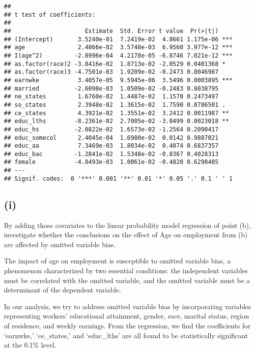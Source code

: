 \documentclass[
]{article}
\begin{document}
\begin{verbatim}
## 
## t test of coefficients:
## 
##                     Estimate  Std. Error t value  Pr(>|t|)    
## (Intercept)       3.5240e-01  7.2419e-02  4.8661 1.175e-06 ***
## age               2.4866e-02  3.5748e-03  6.9560 3.977e-12 ***
## I(age^2)         -2.8996e-04  4.2178e-05 -6.8746 7.021e-12 ***
## as.factor(race)2 -3.8416e-02  1.8713e-02 -2.0529 0.0401368 *  
## as.factor(race)3 -4.7501e-03  1.9209e-02 -0.2473 0.8046987    
## earnwke           3.4057e-05  9.5945e-06  3.5496 0.0003895 ***
## married          -2.6098e-03  1.0509e-02 -0.2483 0.8038795    
## ne_states         1.6760e-02  1.4487e-02  1.1570 0.2473497    
## so_states         2.3948e-02  1.3615e-02  1.7590 0.0786501 .  
## ce_states         4.3921e-02  1.3551e-02  3.2412 0.0011987 ** 
## educ_lths        -8.2361e-02  2.7005e-02 -3.0499 0.0023018 ** 
## educ_hs          -2.0822e-02  1.6573e-02 -1.2564 0.2090417    
## educ_somecol      2.4045e-04  1.6980e-02  0.0142 0.9887021    
## educ_aa           7.3469e-03  1.8034e-02  0.4074 0.6837357    
## educ_bac         -1.2841e-02  1.5348e-02 -0.8367 0.4028313    
## female           -4.8493e-03  1.0061e-02 -0.4820 0.6298405    
## ---
## Signif. codes:  0 '***' 0.001 '**' 0.01 '*' 0.05 '.' 0.1 ' ' 1
\end{verbatim}

\hypertarget{i-3}{%
\subsection{(i)}\label{i-3}}

By adding those covariates to the linear probability model regression of
point (b), investigate whether the conclusions on the effect of Age on
employment from (b) are affected by omitted variable bias. \vspace{1em}

The impact of age on employment is susceptible to omitted variable bias,
a phenomenon characterized by two essential conditions: the independent
variables must be correlated with the omitted variable, and the omitted
variable must be a determinant of the dependent variable.

In our analysis, we try to address omitted variable bias by
incorporating variables representing workers' educational attainment,
gender, race, marital status, region of residence, and weekly earnings.
From the regression, we find the coefficients for `earnwke,'
`ce\_states,' and `educ\_lths' are all found to be statistically
significant at the 0.1\% level.
\end{document}
